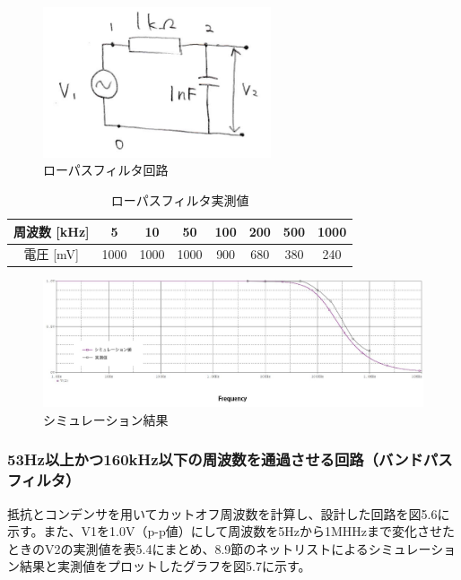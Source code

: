 \documentclass{jlreq}
\numberwithin{equation}{section}
\begin{document}
\begin{figure}[H]
  \centering
  \includegraphics[width=0.6\textwidth]{assets/lowpasskairo.png}
  \caption{ローパスフィルタ回路}
\end{figure}

\begin{table}[H]
  \centering
  \caption{ローパスフィルタ実測値}
  \begin{tabular}{|c|c|c|c|c|c|c|c|}
    \hline
    周波数 [kHz] & 5 & 10 & 50 & 100 & 200 & 500 & 1000 \\ \hline
    電圧 [mV] & 1000 & 1000 & 1000 & 900 & 680 & 380 & 240 \\ \hline
  \end{tabular}
\end{table}

\begin{figure}[H]
  \centering
  \includegraphics[width=\textwidth]{assets/lowpass.jpg}
  \caption{シミュレーション結果}
\end{figure}

\subsubsection{53Hz以上かつ160kHz以下の周波数を通過させる回路（バンドパスフィルタ）}
抵抗とコンデンサを用いてカットオフ周波数を計算し、設計した回路を図5.6に示す。また、V1を1.0V（p-p値）にして周波数を5Hzから1MHHzまで変化させたときのV2の実測値を表5.4にまとめ、8.9節のネットリストによるシミュレーション結果と実測値をプロットしたグラフを図5.7に示す。
\end{document}
